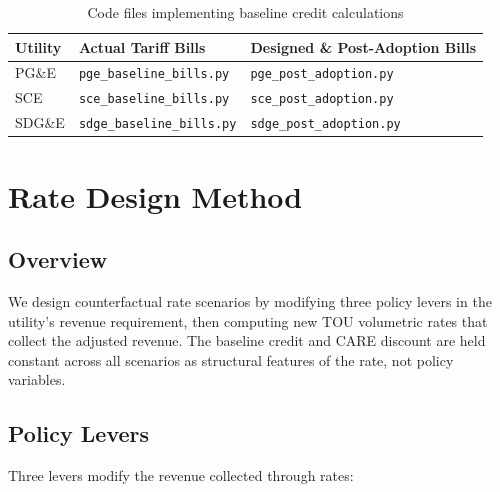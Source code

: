 \documentclass[11pt]{article}
\begin{document}
\begin{table}[htbp]
\centering
\caption{Code files implementing baseline credit calculations}
\begin{tabular}{l l l}
\toprule
\textbf{Utility} & \textbf{Actual Tariff Bills} & \textbf{Designed \& Post-Adoption Bills} \\
\midrule
PG\&E & \texttt{pge\_baseline\_bills.py} & \texttt{pge\_post\_adoption.py} \\
SCE & \texttt{sce\_baseline\_bills.py} & \texttt{sce\_post\_adoption.py} \\
SDG\&E & \texttt{sdge\_baseline\_bills.py} & \texttt{sdge\_post\_adoption.py} \\
\bottomrule
\end{tabular}
\end{table}

%
%

\newpage
\section{Rate Design Method}

\subsection{Overview}

We design counterfactual rate scenarios by modifying three policy levers in the utility's revenue requirement, then computing new TOU volumetric rates that collect the adjusted revenue. The baseline credit and CARE discount are held constant across all scenarios as structural features of the rate, not policy variables.

\subsection{Policy Levers}

Three levers modify the revenue collected through rates:
\end{document}
